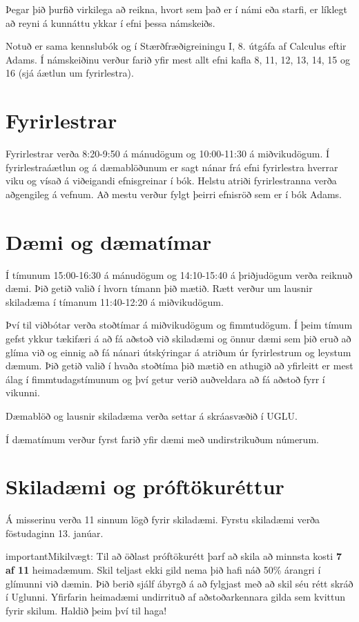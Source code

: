 \documentclass[a4paper,10pt,icelandic]{sphinxmanual}
\begin{document}
Þegar þið þurfið virkilega að reikna, hvort sem það er í námi eða
starfi,   er líklegt að reyni á kunnáttu ykkar í efni þessa
námskeiðs.

Notuð er sama kennslubók og í Stærðfræðigreiningu I, 8. útgáfa af
Calculus eftir Adams. Í námskeiðinu verður farið yfir mest allt efni kafla 8, 11,
12, 13, 14, 15 og 16 (sjá áætlun um fyrirlestra).


\section*{Fyrirlestrar}
\label{umnamskeidid:fyrirlestrar}
Fyrirlestrar verða 8:20-9:50 á mánudögum og 10:00-11:30 á
miðvikudögum.  Í fyrirlestraáætlun og  á
dæmablöðunum er sagt nánar frá efni fyrirlestra hverrar viku og
vísað á viðeigandi efnisgreinar í bók.  Helstu atriði
fyrirlestranna verða aðgengileg á vefnum.
Að mestu verður fylgt þeirri efnisröð sem er í bók Adams.


\section*{Dæmi og dæmatímar}
\label{umnamskeidid:daemi-og-daematimar}
Í tímunum 15:00-16:30 á mánudögum og 14:10-15:40 á þriðjudögum verða
reiknuð dæmi. Þið getið valið í hvorn tímann þið mætið. Rætt verður um lausnir skiladæma í tímanum 11:40-12:20 á miðvikudögum.

Því til viðbótar verða stoðtímar  á miðvikudögum og fimmtudögum.  Í þeim tímum gefst ykkur tækifæri á að fá aðstoð við skiladæmi og önnur dæmi sem þið eruð að glíma við og einnig að fá nánari útskýringar á atriðum úr fyrirlestrum og leystum dæmum. Þið getið valið í hvaða stoðtíma þið mætið en athugið að yfirleitt er mest álag í fimmtudagstímunum og því getur verið auðveldara að fá aðstoð fyrr í vikunni.

Dæmablöð og lausnir skiladæma verða settar á skráasvæðið í UGLU.

Í dæmatímum verður fyrst farið yfir dæmi með undirstrikuðum númerum.


\section*{Skiladæmi og próftökuréttur}
\label{umnamskeidid:skiladaemi-og-proftokurettur}
Á misserinu verða 11 sinnum lögð fyrir
skiladæmi. Fyrstu skiladæmi verða föstudaginn 13. janúar.

\begin{notice}{important}{Mikilvægt:}
Til að öðlast próftökurétt þarf að skila að minnsta kosti \textbf{7 af 11} heimadæmum. Skil teljast ekki gild nema þið hafi náð 50\% árangri í
glímunni við dæmin. Þið berið sjálf ábyrgð á að fylgjast með að skil séu rétt skráð í Uglunni. Yfirfarin heimadæmi undirrituð af
aðstoðarkennara gilda sem kvittun fyrir skilum. Haldið þeim því til haga!
\end{notice}
\end{document}
